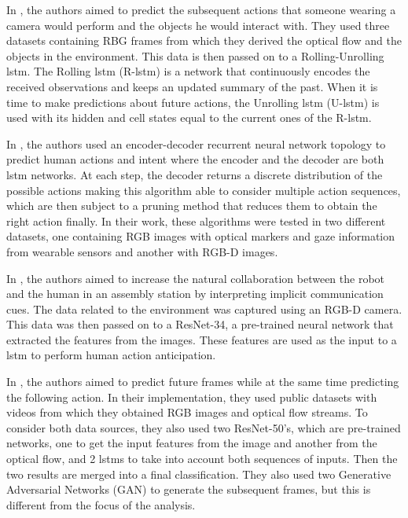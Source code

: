 In \textcite{Furnari2021}, the authors aimed to predict the subsequent actions that someone wearing a camera would perform and the objects he would interact with. They used three datasets containing RBG frames from which they derived the optical flow and the objects in the environment. This data is then passed on to a Rolling-Unrolling \acf{lstm}. The Rolling \acs{lstm} (R-\acs{lstm}) is a network that continuously encodes the received observations and keeps an updated summary of the past. When it is time to make predictions about future actions, the Unrolling \acs{lstm} (U-\acs{lstm}) is used with its hidden and cell states equal to the current ones of the R-\acs{lstm}.

In \textcite{Schydlo2018}, the authors used an encoder-decoder recurrent neural network topology to predict human actions and intent where the encoder and the decoder are both \acs{lstm} networks. At each step, the decoder returns a discrete distribution of the possible actions making this algorithm able to consider multiple action sequences, which are then subject to a pruning method that reduces them to obtain the right action finally. In their work, these algorithms were tested in two different datasets, one containing RGB images with optical markers and gaze information from wearable sensors and another with RGB-D images.

In \textcite{Moutinho2023}, the authors aimed to increase the natural collaboration between the robot and the human in an assembly station by interpreting implicit communication cues. The data related to the environment was captured using an RGB-D camera. This data was then passed on to a ResNet-34, a pre-trained neural network that extracted the features from the images. These features are used as the input to a \acs{lstm} to perform human action anticipation.

In \textcite{Gammulle2019}, the authors aimed to predict future frames while at the same time predicting the following action. In their implementation, they used public datasets with videos from which they obtained RGB images and optical flow streams. To consider both data sources, they also used two ResNet-50's, which are pre-trained networks, one to get the input features from the image and another from the optical flow, and 2 \acs{lstm}s to take into account both sequences of inputs. Then the two results are merged into a final classification. They also used two Generative Adversarial Networks (GAN) to generate the subsequent frames, but this is different from the focus of the analysis.

